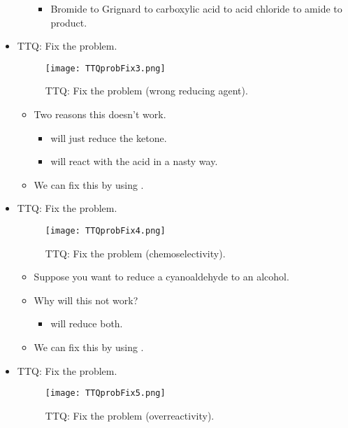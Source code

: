 \documentclass[../notes.tex]{subfiles}
\begin{document}
\begin{itemize}
\begin{itemize}
        \begin{itemize}
            \item Bromide to Grignard to carboxylic acid to acid chloride to amide to product.
        \end{itemize}
    \end{itemize}
    \item TTQ: Fix the problem.
    \begin{figure}[h!]
        \centering
        \texttt{[image: TTQprobFix3.png]}
        \caption{TTQ: Fix the problem (wrong reducing agent).}
        \label{fig:TTQprobFix3}
    \end{figure}
    \pagebreak
    \begin{itemize}
        \item Two reasons this doesn't work.
        \begin{itemize}
            \item {} will just reduce the ketone.
            \item {} will react with the acid in a nasty way.
        \end{itemize}
        \item We can fix this by using .
    \end{itemize}
    \item TTQ: Fix the problem.
    \begin{figure}[h!]
        \centering
        \texttt{[image: TTQprobFix4.png]}
        \caption{TTQ: Fix the problem (chemoselectivity).}
        \label{fig:TTQprobFix4}
    \end{figure}
    \begin{itemize}
        \item Suppose you want to reduce a cyanoaldehyde to an alcohol.
        \item Why will this not work?
        \begin{itemize}
            \item {} will reduce both.
        \end{itemize}
        \item We can fix this by using .
    \end{itemize}
    \item TTQ: Fix the problem.
    \begin{figure}[h!]
        \centering
        \texttt{[image: TTQprobFix5.png]}
        \caption{TTQ: Fix the problem (overreactivity).}
        \label{fig:TTQprobFix5}

\end{figure}
\end{itemize}
\end{document}
